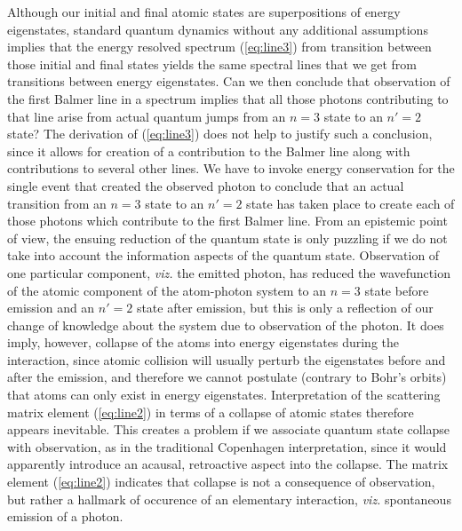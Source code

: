 \documentclass[final,3p,12pt]{elsarticle3}
\begin{document}
Although our initial and final atomic states are superpositions of
energy eigenstates, standard quantum dynamics without any additional
assumptions implies that the energy resolved spectrum (\ref{eq:line3}) from 
transition between those initial and final states yields the same  
spectral lines that we get from transitions between energy eigenstates.
Can we then conclude that observation of the first Balmer line in a spectrum 
implies that all those photons contributing to that line arise from
actual quantum jumps from an $n=3$ state to an $n'=2$ state?
The derivation of (\ref{eq:line3}) does not help to justify such a
conclusion, since it allows for creation of a contribution to the
Balmer line along with contributions to several other lines. 
We have to invoke energy conservation for the single event that
created the observed photon to conclude that an actual
transition from an $n=3$ state to an $n'=2$ state has taken place to create
each of those photons which contribute to the first Balmer line. From an
epistemic point of view, the ensuing reduction of the quantum state 
is only puzzling if we do not take into account the information aspects of the 
quantum state. Observation of one particular component, {\it viz.} the emitted 
photon, has reduced the wavefunction of the atomic component of the atom-photon 
system to an $n=3$ state before emission and an $n'=2$ state after emission, but 
this is only a reflection of our change of knowledge about the system due to
observation of the photon. It does imply, however, collapse of the atoms into 
energy eigenstates during the interaction, since atomic collision will usually 
perturb the eigenstates before and after the emission, and therefore we cannot 
postulate (contrary to Bohr's orbits) that atoms can only exist in energy eigenstates.
Interpretation of the scattering matrix element (\ref{eq:line2}) in terms
of a collapse of atomic states therefore appears inevitable.
This creates a problem if we associate quantum state collapse with observation, 
as in the traditional Copenhagen interpretation, since it would apparently 
introduce an acausal, retroactive aspect into the collapse. The 
matrix element (\ref{eq:line2}) indicates that collapse is not
a consequence of observation, but rather a hallmark of occurence of
an elementary interaction, {\it viz.} spontaneous emission of a photon.
\end{document}

